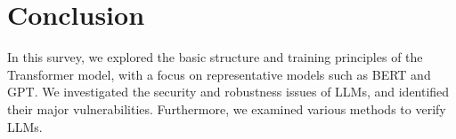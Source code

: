 \documentclass[conference]{IEEEtran}
\begin{document}
\section{Conclusion}
In this survey, we explored the basic structure and training principles 
of the Transformer model, with a focus on representative models such as BERT and 
GPT. We investigated the security and robustness issues of LLMs, and identified 
their major vulnerabilities. Furthermore, we examined various methods to verify LLMs.






\vspace{12pt}
\end{document}
